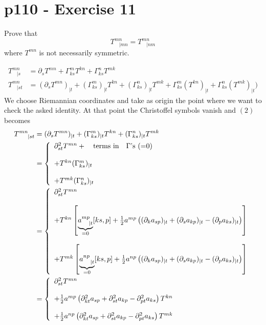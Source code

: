 \section{p110 - Exercise 11}
\begin{tcolorbox}
Prove that $$T^{mn}_{\ \ \ \ |mn} =T^{mn}_{\ \ \ \ |nm}$$ where $T^{mn}$ is not necessarily symmetric.
\end{tcolorbox}
\begin{align}
T^{mn}_{\ \ \ \ |s} &= \partial_s T^{mn} + \Gamma^m_{ks}T^{kn} + \Gamma^n_{ks}T^{mk}\\
T^{mn}_{\ \ \ \ |st} &= (\partial_s T^{mn})_{|t} + (\Gamma^m_{ks})_{|t}T^{kn} + (\Gamma^n_{ks})_{|t}T^{mk}+ \Gamma^m_{ks}(T^{kn})_{|t} + \Gamma^n_{ks}(T^{mk})_{|t})
\end{align}
We choose Riemannian coordinates and take as origin the point where we want to check the asked identity. At that point the Christoffel symbols vanish and $(2)$ becomes
\begin{align}
T^{mn}_{\ \ \ \ |st} &= (\partial_s T^{mn})_{|t} + (\Gamma^m_{ks})_{|t}T^{kn} + (\Gamma^n_{ks})_{|t}T^{mk}\\
&= \left\{\begin{array}{l}\partial^2_{st}T^{mn}+\quad \text{terms in}\quad \Gamma\text{'s (=0)}\\\\ + T^{kn} (\Gamma^m_{ks})_{|t}\\\\ + T^{mk} (\Gamma^n_{ks})_{|t}\end{array}\right.\\
&= \left\{\begin{array}{l}\partial^2_{st}T^{mn}\\\\ + T^{kn} \left[\underbrace{a^{mp}_{\ \ \ |t}}_{=0}[ks,p] + \half a^{mp} \left( (\partial_{k} a_{sp})_{|t} + (\partial_{s} a_{kp})_{|t} - (\partial_{p} a_{ks})_{|t} \right) \right]\\\\  + T^{mk} \left[\underbrace{a^{np}_{\ \ \ |t}}_{=0}[ks,p] + \half a^{np} \left( (\partial_{k} a_{sp})_{|t} + (\partial_{s} a_{kp})_{|t} - (\partial_{p} a_{ks})_{|t} \right) \right]\end{array}\right.\\
&= \left\{\begin{array}{l}\partial^2_{st}T^{mn}\\\\ +\half a^{mp} \left( \partial^2_{kt} a_{sp} + \partial^2_{st} a_{kp} - \partial^2_{pt} a_{ks} \right) T^{kn}  \\\\  + \half   a^{np} \left( \partial^2_{kt} a_{sp} + \partial^2_{st} a_{kp} - \partial^2_{pt} a_{ks}\right)T^{mk} \end{array}\right.
\end{align}
